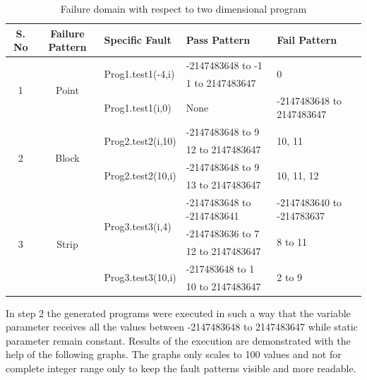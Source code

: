 \documentclass{acm_proc_article-sp}
\begin{document}
\begin{table}[t]
\centering

\begin{tabular}{|c|c|l|l|l|}

\hline 

\textbf{S. No}		& \textbf{Failure Pattern}	& \textbf{Specific Fault}	 		& \textbf{Pass Pattern} 			& \textbf{Fail Pattern} 			\\ \hline 


\multirow{3}{*}{1} 	&\multirow{3}{*}{Point}	&\multirow{2}{*}{Prog1.test1(-4,i)}	&-2147483648 to -1				&\multirow{2}{*}{0}	  			\\ \cline{4-4} 
				&					&							&1 to 2147483647				&	                           			\\ \cline{3-5}
				&					&Prog1.test1(i,0)				&None						&-2147483648 to 2147483647 	\\ \hline
\multirow{4}{*}{2}	&\multirow{4}{*}{Block}	&\multirow{2}{*}{Prog2.test2(i,10)}	&-2147483648 to 9				&\multirow{2}{*}{10, 11}			\\ \cline{4-4} 
				&					&							&12 to 2147483647				&		   		   			\\ \cline{3-5} 
				&					&\multirow{2}{*}{Prog2.test2(10,i)}	&-2147483648 to 9				&\multirow{2}{*}{10, 11, 12}		\\ \cline{4-4} 
				&					&							&13 to 2147483647				&							\\ \hline
\multirow{5}{*}{3} 	&\multirow{5}{*}{Strip}	&\multirow{3}{*}{Prog3.test3(i,4)}	&-2147483648 to -2147483641	&-2147483640 to -214783637 		\\ \cline{4-5} 
				&					&	 						&-2147483636 to 7				&\multirow{2}{*}{8 to 11}			\\ \cline{4-4} 
				&					&	 						&12 to 2147483647				&							\\ \cline{3-5} 
				&					& \multirow{2}{*}{Prog3.test3(10,i)}	&-217483648 to 1				&\multirow{2}{*}{2 to 9}			\\ \cline{4-4}
				&					&	 						&10 to 2147483647				&							\\ \hline
\end{tabular}
\caption{Failure domain with respect to two dimensional program}
\label{tb:failtable}
\end{table}


In step 2 the generated programs were executed in such a way that the variable parameter receives all the values between -2147483648 to 2147483647 while static parameter remain constant. Results of the execution are demonstrated with the help of the following graphs. The graphs only scales to 100 values and not for complete integer range only to keep the fault patterns visible and more readable.
\end{document}
